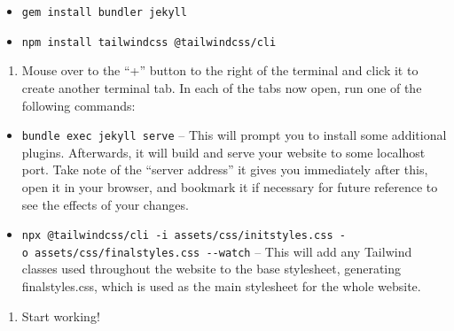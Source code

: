 \documentclass[
]{book}
\providecommand{\tightlist}{%
  \setlength{\itemsep}{0pt}\setlength{\parskip}{0pt}}
\begin{document}
\begin{itemize}
\tightlist
\item
  \texttt{gem\ install\ bundler\ jekyll}
\item
  \texttt{npm\ install\ tailwindcss\ @tailwindcss/cli}
\end{itemize}

\begin{enumerate}
\def\labelenumi{\arabic{enumi}.}
\setcounter{enumi}{7}
\tightlist
\item
  Mouse over to the ``+'' button to the right of the terminal and click it to create another terminal tab. In each of the tabs now open, run one of the following commands:
\end{enumerate}

\begin{itemize}
\tightlist
\item
  \texttt{bundle\ exec\ jekyll\ serve} -- This will prompt you to install some additional plugins. Afterwards, it will build and serve your website to some localhost port. Take note of the ``server address'' it gives you immediately after this, open it in your browser, and bookmark it if necessary for future reference to see the effects of your changes.
\item
  \texttt{npx\ @tailwindcss/cli\ -i\ assets/css/initstyles.css\ -o\ assets/css/finalstyles.css\ -\/-watch} -- This will add any Tailwind classes used throughout the website to the base stylesheet, generating finalstyles.css, which is used as the main stylesheet for the whole website.
\end{itemize}

\begin{enumerate}
\def\labelenumi{\arabic{enumi}.}
\setcounter{enumi}{8}
\tightlist
\item
  Start working!
\end{enumerate}


\end{document}
